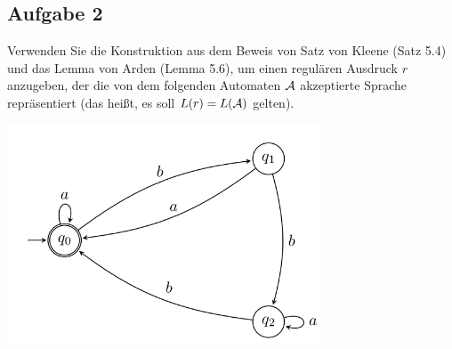 \subsection{Aufgabe 2}
Verwenden Sie die Konstruktion aus dem Beweis von Satz von Kleene (Satz 5.4) und das
Lemma von Arden (Lemma 5.6), um einen regulären Ausdruck $r$ anzugeben, der die von dem
folgenden Automaten $\mathcal{A}$ akzeptierte Sprache repräsentiert (das heißt, es soll $L(r) = L(\mathcal{A})$ gelten).

\includegraphics[width=0.7\textwidth]{pics/Blatt11_2.png}
 
